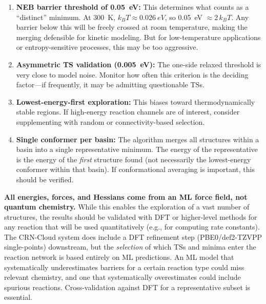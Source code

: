\documentclass[11pt,a4paper]{article}
\begin{document}
\begin{evaluation}
\begin{enumerate}
    \item \textbf{NEB barrier threshold of \SI{0.05}{eV}:} This determines what counts as a ``distinct'' minimum. At \SI{300}{K}, $k_BT \approx \SI{0.026}{eV}$, so \SI{0.05}{eV} $\approx 2\,k_BT$. Any barrier below this will be freely crossed at room temperature, making the merging defensible for kinetic modeling. But for low-temperature applications or entropy-sensitive processes, this may be too aggressive.

    \item \textbf{Asymmetric TS validation (\SI{0.005}{eV}):} The one-side relaxed threshold is very close to model noise. Monitor how often this criterion is the deciding factor---if frequently, it may be admitting questionable TSs.

    \item \textbf{Lowest-energy-first exploration:} This biases toward thermodynamically stable regions. If high-energy reaction channels are of interest, consider supplementing with random or connectivity-based selection.

    \item \textbf{Single conformer per basin:} The algorithm merges all structures within a basin into a single representative minimum. The energy of the representative is the energy of the \emph{first} structure found (not necessarily the lowest-energy conformer within that basin). If conformational averaging is important, this should be verified.
\end{enumerate}
\end{evaluation}

\begin{concern}
\textbf{All energies, forces, and Hessians come from an ML force field, not quantum chemistry.} While this enables the exploration of a vast number of structures, the results should be validated with DFT or higher-level methods for any reaction that will be used quantitatively (e.g., for computing rate constants). The CRN-Cloud system does include a DFT refinement step (PBE0/def2-TZVPP single-points) downstream, but the \emph{selection} of which TSs and minima enter the reaction network is based entirely on ML predictions. An ML model that systematically underestimates barriers for a certain reaction type could miss relevant chemistry, and one that systematically overestimates could include spurious reactions. Cross-validation against DFT for a representative subset is essential.
\end{concern}
\end{document}
